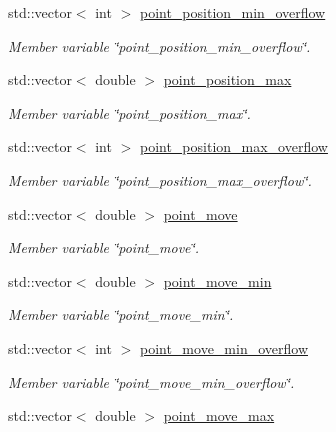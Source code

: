 \begin{DoxyCompactItemize}
std\+::vector$<$ int $>$ \mbox{\hyperlink{classPoint_a0c0cab60e2a94adce49302c2647b9c45}{point\+\_\+position\+\_\+min\+\_\+overflow}}
\begin{DoxyCompactList}\small\item\em Member variable \char`\"{}point\+\_\+position\+\_\+min\+\_\+overflow\char`\"{}. \end{DoxyCompactList}\item 
std\+::vector$<$ double $>$ \mbox{\hyperlink{classPoint_abae7f1b61c44e4829bfa864dffc400f6}{point\+\_\+position\+\_\+max}}
\begin{DoxyCompactList}\small\item\em Member variable \char`\"{}point\+\_\+position\+\_\+max\char`\"{}. \end{DoxyCompactList}\item 
std\+::vector$<$ int $>$ \mbox{\hyperlink{classPoint_abd6f21f21522ff1021ee4cb96ff1e4e0}{point\+\_\+position\+\_\+max\+\_\+overflow}}
\begin{DoxyCompactList}\small\item\em Member variable \char`\"{}point\+\_\+position\+\_\+max\+\_\+overflow\char`\"{}. \end{DoxyCompactList}\item 
std\+::vector$<$ double $>$ \mbox{\hyperlink{classPoint_a1a2a481ca7d0fa5f3212ad3d4d2871a9}{point\+\_\+move}}
\begin{DoxyCompactList}\small\item\em Member variable \char`\"{}point\+\_\+move\char`\"{}. \end{DoxyCompactList}\item 
std\+::vector$<$ double $>$ \mbox{\hyperlink{classPoint_af686f563a571b1e0a2871f5428c068d9}{point\+\_\+move\+\_\+min}}
\begin{DoxyCompactList}\small\item\em Member variable \char`\"{}point\+\_\+move\+\_\+min\char`\"{}. \end{DoxyCompactList}\item 
std\+::vector$<$ int $>$ \mbox{\hyperlink{classPoint_a9d647ea8a7c6def7fd1e07592adaabaa}{point\+\_\+move\+\_\+min\+\_\+overflow}}
\begin{DoxyCompactList}\small\item\em Member variable \char`\"{}point\+\_\+move\+\_\+min\+\_\+overflow\char`\"{}. \end{DoxyCompactList}\item 
std\+::vector$<$ double $>$ \mbox{\hyperlink{classPoint_ab54f1aa3f0183ad0dd9d60d3a685ab5e}{point\+\_\+move\+\_\+max}}

\end{DoxyCompactItemize}
